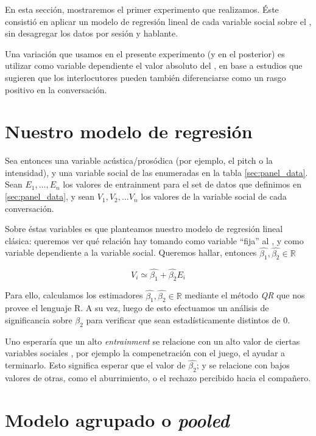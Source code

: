 En esta sección, mostraremos el primer experimento que realizamos. Éste consistió en aplicar un modelo de regresión lineal de cada variable social sobre el \entrainment, sin desagregar los datos por sesión y hablante.

Una variación que usamos en el presente experimento (y en el posterior) es utilizar como variable dependiente el valor absoluto del \entrainment, en base a estudios que sugieren que los interlocutores pueden también diferenciarse como un rasgo positivo en la conversación.

\section{Nuestro modelo de regresión}

Sea entonces una variable acústica/prosódica (por ejemplo, el pitch o la intensidad), y una variable social de las enumeradas en la tabla \ref{sec:panel_data}. Sean $E_1, \ldots, E_n$ los valores de entrainment para el set de datos que definimos en \ref{sec:panel_data}, y sean $V_1, V_2, \ldots V_n$ los valores de la variable social de cada conversación.

Sobre éstas variables es que planteamos nuestro modelo de regresión lineal clásica: queremos ver qué relación hay tomando como variable ``fija'' al \entrainment, y como variable dependiente a la variable social. Queremos hallar, entonces $\widehat{\beta_1}, \widehat{\beta_2} \in \mathbb{R}$

\begin{equation}
  V_i \simeq \widehat{\beta_1} + \widehat{\beta_2} E_i
\end{equation}


Para ello, calculamos los estimadores $\widehat{\beta_1}, \widehat{\beta_2} \in \mathbb{R}$ mediante el método \emph{QR} que nos provee el lenguaje R. A su vez, luego de esto efectuamos un análisis de significancia sobre $\beta_2$ para verificar que sean estadísticamente distintos de 0.

Uno esperaría que un alto \emph{entrainment} se relacione con un alto valor de ciertas variables sociales \cite{BRE1996}, por ejemplo la compenetración con el juego, el ayudar a terminarlo. Esto significa esperar que el valor de $\widehat{\beta_2}$; y se relacione con bajos valores de otras, como el aburrimiento, o el rechazo percibido hacia el compañero.


\section{Modelo agrupado o \emph{pooled}}


